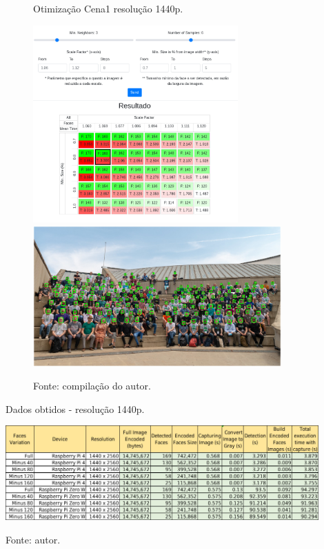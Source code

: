 \begin{figure}[H]
    \centering
    \caption[Otimização Cena 1 - resolução 1440p.]{Otimização Cena1 resolução 1440p.}
    \includegraphics[width=0.70\textwidth]{Cap4_Experimentos_Realizados/Figures/cena1_param_1440p_matriz.jpg}
    \includegraphics[width=0.85\textwidth]{Cap4_Experimentos_Realizados/Figures/cena1_param_1440p_faces.jpg}
    \caption*{Fonte: compilação do autor.\footnotemark}
    \label{fig:otimizacaoCena1_1440p}
\end{figure}

    
\begin{table}
    \centering
    \caption[Dados obtidos - resolução 1440p.]{Dados obtidos - resolução 1440p.}
    \includegraphics[width=0.90\textwidth]{Cap4_Experimentos_Realizados/Figures/cena1_dados_1440p.jpg}
    \caption*{Fonte: autor.}
    \label{fig:dadosCena1_1440p}
\end{table}

